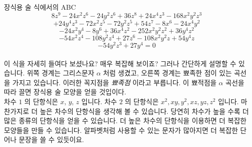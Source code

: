 \begin{surferPage}{장식용 술}
식에서의 ABC
  \smallskip
\[8z^9-24x^2z^6-24y^2z^6+36z^8+24x^4z^3-168x^2y^2z^3\]
\[+24y^4z^3-72x^2z^5-72y^2z^5+54z^7-8x^6-24x^4y^2\]
\[-24x^2y^4-8y^6 + 36x^4z^2-252x^2y^2z^2+36y^4z^2\]
\[- 54x^2z^4-108y^2z^4 + 27z^6-108x^2y^2z + 54y^4z\]
\[-54y^2z^3 + 27y^4 = 0\]\\
\vspace{0.3cm}
이 식을 자세히 들여다 보셨나요? 매우 복잡해 보이죠? 그러나 간단하게 설명할 수 있습니다. 위쪽 경계는 그리스문자 $\alpha$ 처럼 생겼고, 오른쪽 경계는 뾰족한 점이 있는 곡선을 가지고 있습니다. 이러한 꼭지점을 {\it 뾰족점} 이라고 부릅니다. 이 뾰적점을 $\alpha$ 곡선을 따라 끌면 장식용 술 모양을 얻을 것입이다. \\
\vspace{0.3cm}
차수 $1$ 의 단항식은 $x$, $y$, $z$ 입니다. 차수 $2$ 의 단항식은 $x^2, xy, y^2, xz, yz, z^2$ 입니다. 마찬가지로 더 높은 차수의 단항식을 생각해 볼 수 있습니다. 당연히 차수가 높을 수록 더 많은 종류의 단항식을 얻을 수 있습니다. 더 높은 차수의 단항식을 이용하면 더 복잡한 모양들을 만들 수 있습니다. 알파벳처럼 사용할 수 있는 문자가 많아지면 더 복잡한 단어나 문장을 쓸 수 있듯이요.
\end{surferPage}
